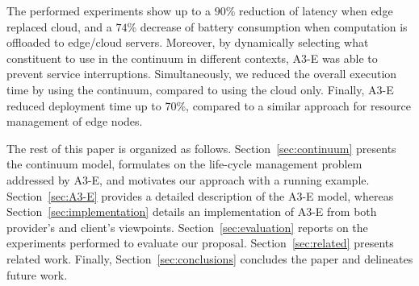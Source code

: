 
The performed experiments show up to a $90$\% reduction of latency when edge replaced cloud, and a $74$\% decrease of battery consumption when computation is offloaded 
to edge/cloud servers. Moreover, by dynamically selecting what constituent to use in the continuum in different contexts, 
A3-E was able to prevent service interruptions. Simultaneously, we reduced the overall execution time by using the continuum, compared to using the cloud only. Finally, A3-E reduced deployment time up to 70\%, compared to a similar approach for resource management of edge nodes.











The rest of this paper is organized as follows. Section~\ref{sec:continuum} presents the continuum model, formulates on the life-cycle management problem addressed by A3-E, and motivates our approach with a running example.
Section~\ref{sec:A3-E} provides a detailed description of the A3-E model, whereas Section~\ref{sec:implementation} details an implementation of A3-E from both provider's and client's viewpoints. Section~\ref{sec:evaluation} reports on the experiments performed to evaluate our proposal. Section~\ref{sec:related} presents related work. Finally, Section~\ref{sec:conclusions} concludes the paper and delineates future work.


